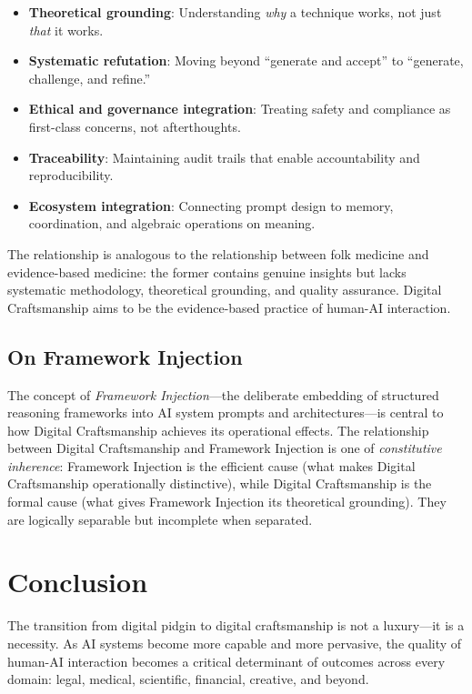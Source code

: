 \documentclass[11pt,a4paper]{article}
\begin{document}
\begin{itemize}
    \item \textbf{Theoretical grounding}: Understanding \emph{why} a technique works, not just \emph{that} it works.
    \item \textbf{Systematic refutation}: Moving beyond ``generate and accept'' to ``generate, challenge, and refine.''
    \item \textbf{Ethical and governance integration}: Treating safety and compliance as first-class concerns, not afterthoughts.
    \item \textbf{Traceability}: Maintaining audit trails that enable accountability and reproducibility.
    \item \textbf{Ecosystem integration}: Connecting prompt design to memory, coordination, and algebraic operations on meaning.
\end{itemize}

The relationship is analogous to the relationship between folk medicine and evidence-based medicine: the former contains genuine insights but lacks systematic methodology, theoretical grounding, and quality assurance. Digital Craftsmanship aims to be the evidence-based practice of human-AI interaction.

\subsection{On Framework Injection}

The concept of \emph{Framework Injection}---the deliberate embedding of structured reasoning frameworks into AI system prompts and architectures---is central to how Digital Craftsmanship achieves its operational effects. The relationship between Digital Craftsmanship and Framework Injection is one of \emph{constitutive inherence}: Framework Injection is the efficient cause (what makes Digital Craftsmanship operationally distinctive), while Digital Craftsmanship is the formal cause (what gives Framework Injection its theoretical grounding). They are logically separable but incomplete when separated.

\section{Conclusion}
\label{sec:conclusion}

The transition from digital pidgin to digital craftsmanship is not a luxury---it is a necessity. As AI systems become more capable and more pervasive, the quality of human-AI interaction becomes a critical determinant of outcomes across every domain: legal, medical, scientific, financial, creative, and beyond.
\end{document}

